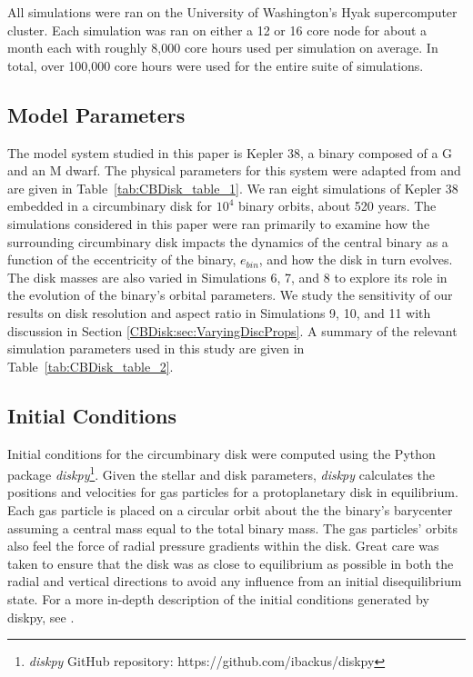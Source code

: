 All simulations were ran on the University of Washington's Hyak supercomputer cluster.  Each simulation was ran on either a 12 or 16 core node for about a month each with roughly 8,000 core hours used per simulation on average.  In total, over 100,000 core hours were used for the entire suite of simulations.

\subsection{Model Parameters}

The model system studied in this paper is Kepler 38, a binary composed of a G and an M dwarf.  The physical parameters for this 
system were adapted from \citet{Orosz2012} and are given in Table~\ref{tab:CBDisk_table_1}.  We ran eight simulations of Kepler 38 embedded in a 
circumbinary disk for $10^4$ binary orbits, about 520 years.  The simulations considered in this paper were ran primarily to examine how 
the surrounding circumbinary disk impacts the dynamics of the central
binary as a function of the eccentricity of the binary, $e_{bin}$, and
how the disk in turn evolves.  The disk masses are also varied in Simulations 6, 7, and 8 to explore its role in the evolution of the binary's orbital parameters.  
We study the sensitivity of our results on disk resolution and aspect ratio in Simulations 9, 10, and 11 with discussion in Section 
\ref{CBDisk:sec:VaryingDiscProps}.  A summary of the relevant simulation parameters used in this study are given in Table~\ref{tab:CBDisk_table_2}. 

\subsection{Initial Conditions}

Initial conditions for the circumbinary disk were computed using the
Python package {\em diskpy}\footnote{{\em diskpy} GitHub repository: https://github.com/ibackus/diskpy}.  
Given the stellar and disk parameters, {\em diskpy}
calculates the positions and velocities for gas particles for a
protoplanetary disk in equilibrium.   Each gas particle is placed on a
circular orbit about the the binary's barycenter assuming a central
mass equal to the total binary mass.  
The gas particles' orbits also feel the force of radial pressure gradients within the disk.  Great care was taken to ensure that the disk
was as close to equilibrium as possible in both the radial and vertical directions to avoid any influence from an initial disequilibrium
state.  For a more in-depth description of the initial conditions generated by diskpy, see \citet{Backus2016}.

